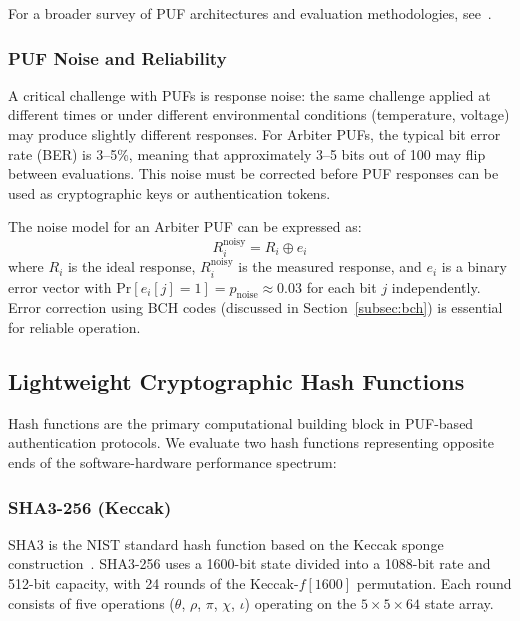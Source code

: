 \documentclass[11pt,a4paper]{article}
\begin{document}
For a broader survey of PUF architectures and evaluation methodologies, see~\cite{puf_overview, puf_overview2}.

\subsubsection{PUF Noise and Reliability}

A critical challenge with PUFs is response noise: the same challenge applied at different times or under different environmental conditions (temperature, voltage) may produce slightly different responses. For Arbiter PUFs, the typical bit error rate (BER) is 3--5\%, meaning that approximately 3--5 bits out of 100 may flip between evaluations. This noise must be corrected before PUF responses can be used as cryptographic keys or authentication tokens.

The noise model for an Arbiter PUF can be expressed as:
\begin{equation}
R_i^{\text{noisy}} = R_i \oplus e_i
\end{equation}
where $R_i$ is the ideal response, $R_i^{\text{noisy}}$ is the measured response, and $e_i$ is a binary error vector with $\text{Pr}[e_i[j] = 1] = p_{\text{noise}} \approx 0.03$ for each bit $j$ independently. Error correction using BCH codes (discussed in Section~\ref{subsec:bch}) is essential for reliable operation.

\subsection{Lightweight Cryptographic Hash Functions}
\label{subsec:lightweight_hash}

Hash functions are the primary computational building block in PUF-based authentication protocols. We evaluate two hash functions representing opposite ends of the software-hardware performance spectrum:

\subsubsection{SHA3-256 (Keccak)}

SHA3 is the NIST standard hash function based on the Keccak sponge construction~\cite{sha3_standard, keccak_team}. SHA3-256 uses a 1600-bit state divided into a 1088-bit rate and 512-bit capacity, with 24 rounds of the Keccak-$f[1600]$ permutation. Each round consists of five operations ($\theta$, $\rho$, $\pi$, $\chi$, $\iota$) operating on the $5\times5\times64$ state array.
\end{document}

